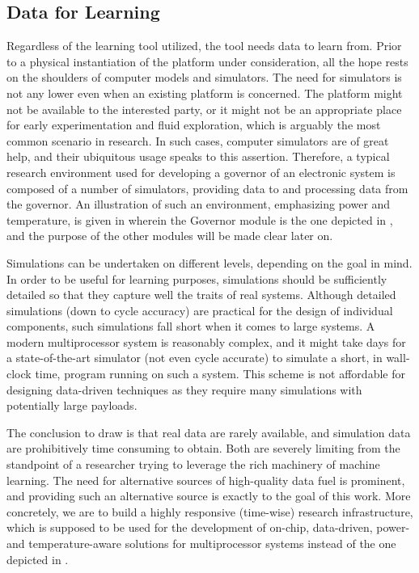 \subsection{Data for Learning} 

Regardless of the learning tool utilized, the tool needs data to learn from.
Prior to a physical instantiation of the platform under consideration, all the
hope rests on the shoulders of computer models and simulators. The need for
simulators is not any lower even when an existing platform is concerned. The
platform might not be available to the interested party, or it might not be an
appropriate place for early experimentation and fluid exploration, which is
arguably the most common scenario in research. In such cases, computer
simulators are of great help, and their ubiquitous usage speaks to this
assertion. Therefore, a typical research environment used for developing a
governor of an electronic system is composed of a number of simulators,
providing data to and processing data from the governor. An illustration of such
an environment, emphasizing power and temperature, is given in
 wherein the Governor module is the one depicted in
, and the purpose of the other modules will be made clear later
on.

Simulations can be undertaken on different levels, depending on the goal in
mind. In order to be useful for learning purposes, simulations should be
sufficiently detailed so that they capture well the traits of real systems.
Although detailed simulations (down to cycle accuracy) are practical for the
design of individual components, such simulations fall short when it comes to
large systems. A modern multiprocessor system is reasonably complex, and it
might take days for a state-of-the-art simulator (not even cycle accurate) to
simulate a short, in wall-clock time, program running on such a system. This
scheme is not affordable for designing data-driven techniques as they require
many simulations with potentially large payloads.

The conclusion to draw is that real data are rarely available, and simulation
data are prohibitively time consuming to obtain. Both are severely limiting from
the standpoint of a researcher trying to leverage the rich machinery of machine
learning. The need for alternative sources of high-quality data fuel is
prominent, and providing such an alternative source is exactly to the goal of
this work. More concretely, we are to build a highly responsive (time-wise)
research infrastructure, which is supposed to be used for the development of
on-chip, data-driven, power- and temperature-aware solutions for multiprocessor
systems instead of the one depicted in .
